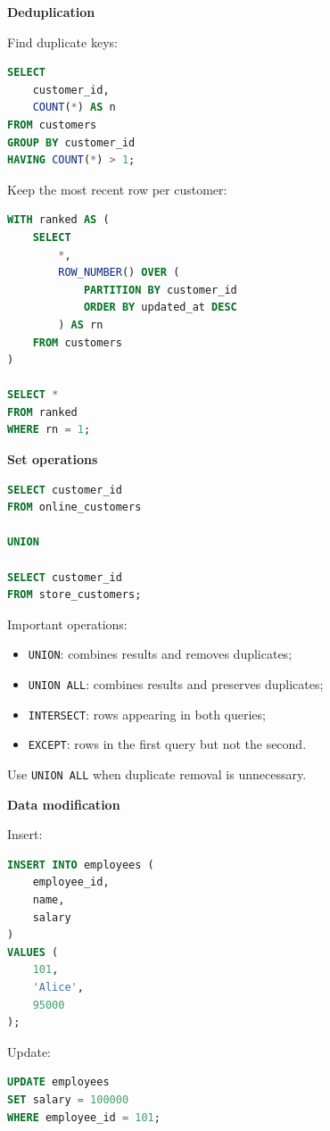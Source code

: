 \documentclass[11pt,letterpaper]{article}
\begin{document}
\textbf{Deduplication}

Find duplicate keys:

\begin{lstlisting}[language=SQL]
SELECT
    customer_id,
    COUNT(*) AS n
FROM customers
GROUP BY customer_id
HAVING COUNT(*) > 1;
\end{lstlisting}

Keep the most recent row per customer:

\begin{lstlisting}[language=SQL]
WITH ranked AS (
    SELECT
        *,
        ROW_NUMBER() OVER (
            PARTITION BY customer_id
            ORDER BY updated_at DESC
        ) AS rn
    FROM customers
)

SELECT *
FROM ranked
WHERE rn = 1;
\end{lstlisting}

\textbf{Set operations}

\begin{lstlisting}[language=SQL]
SELECT customer_id
FROM online_customers

UNION

SELECT customer_id
FROM store_customers;
\end{lstlisting}

Important operations:

\begin{itemize}[leftmargin=*]
    \item \texttt{UNION}: combines results and removes duplicates;
    \item \texttt{UNION ALL}: combines results and preserves duplicates;
    \item \texttt{INTERSECT}: rows appearing in both queries;
    \item \texttt{EXCEPT}: rows in the first query but not the second.
\end{itemize}

Use \texttt{UNION ALL} when duplicate removal is unnecessary.

\textbf{Data modification}

Insert:

\begin{lstlisting}[language=SQL]
INSERT INTO employees (
    employee_id,
    name,
    salary
)
VALUES (
    101,
    'Alice',
    95000
);
\end{lstlisting}

Update:

\begin{lstlisting}[language=SQL]
UPDATE employees
SET salary = 100000
WHERE employee_id = 101;
\end{lstlisting}
\end{document}
